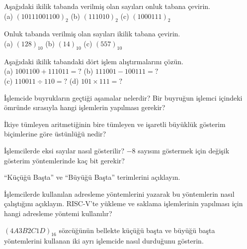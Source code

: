 \begin{alistirma}[\kolay]
Aşağıdaki ikilik tabanda verilmiş olan sayıları onluk tabana çevirin.\\
(a) $(10111001100)_2$ \quad (b) $(111010)_2$ \quad (c) $(1000111)_2$
\end{alistirma}

\begin{alistirma}[\kolay]
Onluk tabanda verilmiş olan sayıları ikilik tabana çevirin.\\
(a) $(128)_{10}$ \quad (b) $(14)_{10}$ \quad (c) $(557)_{10}$
\end{alistirma}

\begin{alistirma}[\orta]
Aşağıdaki ikilik tabandaki dört işlem alıştırmalarını çözün.\\
(a) $1001100 + 111011 = ?$ \quad (b) $111001 - 100111 = ?$\\
(c) $110011 \div 110 = ?$ \quad (d) $101 \times 111 = ?$
\end{alistirma}

\begin{alistirma}[\kolay]
İşlemcide buyrukların geçtiği aşamalar nelerdir? Bir buyruğun işlemci içindeki ömründe sırasıyla hangi işlemlerin yapılması gerekir?
\end{alistirma}

\begin{alistirma}[\kolay]
İkiye tümleyen aritmetiğinin bire tümleyen ve işaretli büyüklük gösterim biçimlerine göre üstünlüğü nedir?
\end{alistirma}

\begin{alistirma}[\orta]
İşlemcilerde eksi sayılar nasıl gösterilir? $-8$ sayısını göstermek için değişik gösterim yöntemlerinde kaç bit gerekir?
\end{alistirma}

\begin{alistirma}[\kolay]
``Küçüğü Başta'' ve ``Büyüğü Başta'' terimlerini açıklayın.
\end{alistirma}

\begin{alistirma}[\orta]
İşlemcilerde kullanılan adresleme yöntemlerini yazarak bu yöntemlerin nasıl çalıştığını açıklayın. RISC-V'te yükleme ve saklama işlemlerinin yapılması için hangi adresleme yöntemi kullanılır?
\end{alistirma}

\begin{alistirma}[\orta]
$(4A3B2C1D)_{16}$ sözcüğünün bellekte küçüğü başta ve büyüğü başta yöntemlerini kullanan iki ayrı işlemcide nasıl durduğunu gösterin.
\end{alistirma}

